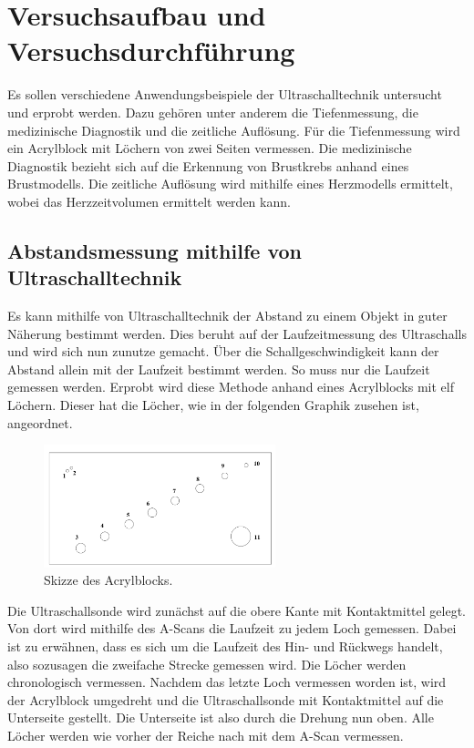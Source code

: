 


\section{Versuchsaufbau und Versuchsdurchführung}
\label{sec:Durchfuehrung}

Es sollen verschiedene Anwendungsbeispiele der Ultraschalltechnik untersucht und erprobt werden.
Dazu gehören unter anderem die Tiefenmessung, die medizinische Diagnostik und die zeitliche Auflösung.
Für die Tiefenmessung wird ein Acrylblock mit Löchern von zwei Seiten vermessen. Die medizinische 
Diagnostik bezieht sich auf die Erkennung von Brustkrebs anhand eines Brustmodells. Die zeitliche 
Auflösung wird mithilfe eines Herzmodells ermittelt, wobei das Herzzeitvolumen ermittelt werden kann.

\subsection{Abstandsmessung mithilfe von Ultraschalltechnik}
Es kann mithilfe von Ultraschalltechnik der Abstand zu einem Objekt in guter Näherung bestimmt werden. 
Dies beruht auf der Laufzeitmessung des Ultraschalls und wird sich nun zunutze gemacht. Über die 
Schallgeschwindigkeit kann der Abstand allein mit der Laufzeit bestimmt werden. So muss nur die 
Laufzeit gemessen werden. Erprobt wird diese Methode anhand eines Acrylblocks mit elf Löchern. Dieser 
hat die Löcher, wie in der folgenden Graphik zusehen ist, angeordnet.

\begin{figure}[H]
    \centering
    \includegraphics[width=0.6\textwidth]{Acrylblock.png}
    \caption{Skizze des Acrylblocks.}
    \label{fig:Acryblock}
\end{figure}

Die Ultraschallsonde wird zunächst auf die obere Kante mit Kontaktmittel gelegt. Von dort wird mithilfe 
des A-Scans die Laufzeit zu jedem Loch gemessen. Dabei ist zu erwähnen, dass es sich um die Laufzeit 
des Hin- und Rückwegs handelt, also sozusagen die zweifache Strecke gemessen wird. Die Löcher werden 
chronologisch vermessen. Nachdem das letzte Loch vermessen worden ist, wird der Acrylblock umgedreht 
und die Ultraschallsonde mit Kontaktmittel auf die Unterseite gestellt. Die Unterseite ist also durch 
die Drehung nun oben. Alle Löcher werden wie vorher der Reiche nach mit dem A-Scan vermessen. \\

